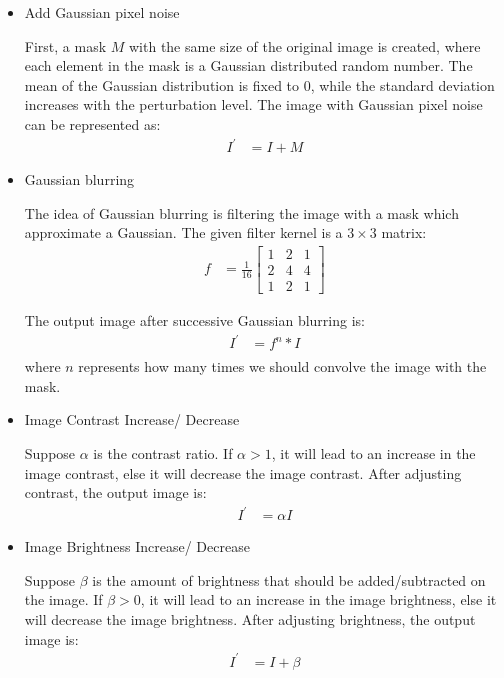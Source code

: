 \documentclass{article}
\begin{document}
\begin{itemize}
    \item Add Gaussian pixel noise
    
    First, a mask $M$ with the same size of the original image is created, where each element in the mask is a Gaussian distributed random number. The mean of the Gaussian distribution is fixed to 0, while the standard deviation increases with the perturbation level. The image with Gaussian pixel noise can be represented as:
    \begin{align*}
    I^{'} & = I+M
    \end{align*}
    
    \item Gaussian blurring
    
    The idea of Gaussian blurring is filtering the image with a mask which approximate a Gaussian. The given filter kernel is a $3 \times 3$ matrix:
    \begin{align*}
    f & = \frac{1}{16}\begin{bmatrix}
            1 & 2 & 1\\
            2 & 4 & 4\\
            1 & 2 & 1
            \end{bmatrix}
    \end{align*}
    
    The output image after successive Gaussian blurring is:
    \begin{align*}
    I^{'} & = f^n * I \\
    \end{align*}
    where $n$ represents how many times we should convolve the image with the mask.
    
    \item Image Contrast Increase/ Decrease
    
    Suppose $\alpha$ is the contrast ratio. If $\alpha > 1$, it will lead to an increase in the image contrast, else it will decrease the image contrast. After adjusting contrast, the output image is: 
    \begin{align*}
    I^{'} & = \alpha I
    \end{align*}
    
    \item Image Brightness Increase/ Decrease
    
    Suppose $\beta$ is the amount of brightness that should be added/subtracted on the image. If $\beta > 0$, it will lead to an increase in the image brightness, else it will decrease the image brightness. After adjusting brightness, the output image is: 
    \begin{align*}
    I^{'} & = I + \beta
    \end{align*}
    

\end{itemize}
\end{document}
